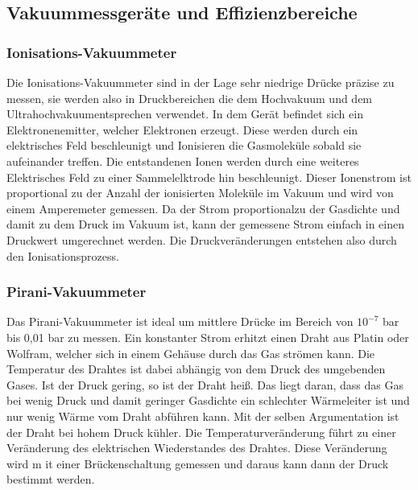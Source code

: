 \subsection{Vakuummessgeräte und Effizienzbereiche}
\subsubsection{Ionisations-Vakuummeter}
Die Ionisations-Vakuummeter sind in der Lage sehr niedrige Drücke präzise zu messen, sie werden also in Druckbereichen die dem Hochvakuum 
und dem Ultrahochvakuumentsprechen verwendet. In dem Gerät befindet sich ein Elektronenemitter, welcher Elektronen erzeugt. Diese
werden durch ein elektrisches Feld beschleunigt und Ionisieren die Gasmoleküle sobald sie aufeinander treffen. Die entstandenen Ionen werden durch eine 
weiteres Elektrisches Feld zu einer Sammelelktrode hin beschleunigt. Dieser Ionenstrom ist proportional zu der Anzahl der ionisierten Moleküle im Vakuum und 
wird von einem Amperemeter gemessen. Da der Strom proportionalzu der Gasdichte und damit zu dem Druck im Vakuum ist, kann der gemessene Strom einfach in einen 
Druckwert umgerechnet werden. Die Druckveränderungen entstehen also durch den Ionisationsprozess.


\subsubsection{Pirani-Vakuummeter}
Das Pirani-Vakuummeter ist ideal um mittlere Drücke im Bereich von $10^{-7}$ bar bis 0,01 bar zu messen.
Ein konstanter Strom erhitzt einen Draht aus Platin oder Wolfram, welcher sich in einem Gehäuse durch das Gas
strömen kann. Die Temperatur des Drahtes ist dabei abhängig von dem Druck des umgebenden Gases. Ist der Druck gering, so ist der Draht heiß.
Das liegt daran, dass das Gas bei wenig Druck und damit geringer Gasdichte ein schlechter Wärmeleiter ist und nur wenig Wärme vom 
Draht abführen kann. Mit der selben Argumentation ist der Draht bei hohem Druck kühler. Die Temperaturveränderung führt zu einer Veränderung
des elektrischen Wiederstandes des Drahtes. Diese Veränderung wird m it einer Brückenschaltung gemessen und daraus kann dann der Druck bestimmt werden.


